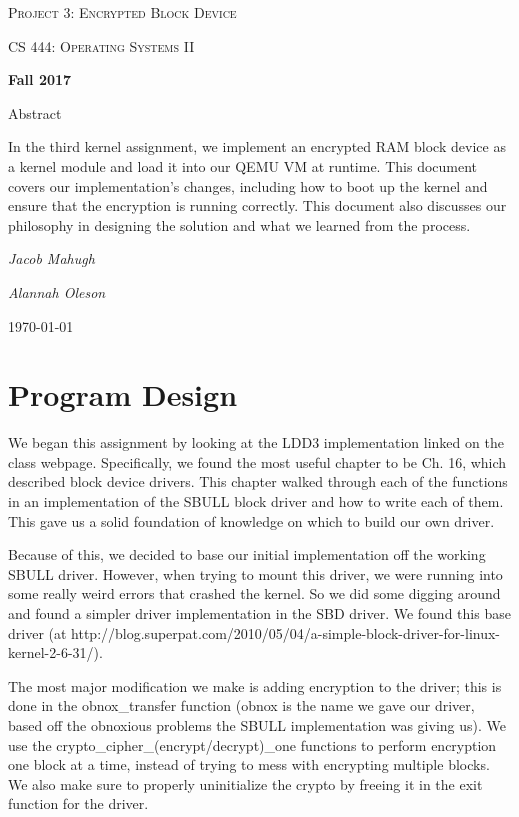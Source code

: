 \documentclass[letterpaper,10pt,titlepage]{article}
\begin{document}
\begin{titlepage}
	\centering
	\vspace*{4cm}
	{\scshape\huge Project 3: Encrypted Block Device\par}
	\vspace{1cm}
	{\scshape\LARGE CS 444: Operating Systems II\par}
	\vspace{0.5cm}
	{\large\bfseries Fall 2017\par}
	{\large Abstract\par}
	\vspace {0.5cm}
	In the third kernel assignment, we implement an encrypted RAM block device
	as a kernel module and load it into our QEMU VM at runtime.
	This document covers our implementation's changes,
	including how to boot up the kernel and ensure that the encryption is running
	correctly. This document also discusses our philosophy
	in designing the solution and what we learned from the process.
	\par
	\vspace{1cm}
	{\Large\itshape Jacob Mahugh\par}
    \vspace {0.5cm}
    {\Large\itshape Alannah Oleson\par}
	\vfill
	{\large \today\par}	
\end{titlepage}



\section{Program Design}
We began this assignment by looking at the LDD3 implementation linked on the class webpage.
Specifically, we found the most useful chapter to be Ch. 16, which described block device drivers. 
This chapter walked through each of the functions in an implementation of the SBULL block driver and how to write each of them. 
This gave us a solid foundation of knowledge on which to build our own driver.

Because of this, we decided to base our initial implementation off the working SBULL driver.
However, when trying to mount this driver, we were running into some really weird errors that crashed the kernel.
So we did some digging around and found a simpler driver implementation in the SBD driver. 
We found this base driver (at http://blog.superpat.com/2010/05/04/a-simple-block-driver-for-linux-kernel-2-6-31/).

The most major modification we make is adding encryption to the driver; this is done in the obnox\_transfer function
(obnox is the name we gave our driver, based off the obnoxious problems the SBULL implementation was giving us). 
We use the crypto\_cipher\_(encrypt/decrypt)\_one functions to perform encryption one block at a time, instead of trying to mess with encrypting multiple blocks. We also make sure to properly uninitialize the crypto by freeing it in the exit function for the driver. 
\end{document}

